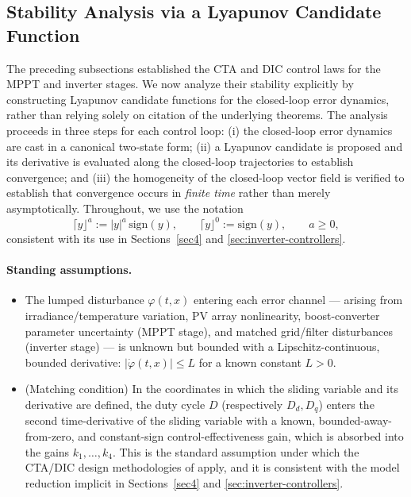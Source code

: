 \documentclass[preprint,12pt]{elsarticle}
\begin{document}
\subsection{Stability Analysis via a Lyapunov Candidate Function}
\label{subsec:stability-discussion}

The preceding subsections established the CTA and DIC control laws for the MPPT and inverter stages. We now analyze their stability explicitly by constructing Lyapunov candidate functions for the closed-loop error dynamics, rather than relying solely on citation of the underlying theorems. The analysis proceeds in three steps for each control loop: (i) the closed-loop error dynamics are cast in a canonical two-state form; (ii) a Lyapunov candidate is proposed and its derivative is evaluated along the closed-loop trajectories to establish convergence; and (iii) the homogeneity of the closed-loop vector field is verified to establish that convergence occurs in \emph{finite time} rather than merely asymptotically. Throughout, we use the notation
\begin{equation}
    \lceil y \rfloor^a := |y|^a\,\mathrm{sign}(y), \qquad \lceil y \rfloor^0 := \mathrm{sign}(y), \qquad a \geq 0,
    \label{eq:power-sign-notation}
\end{equation}
consistent with its use in Sections~\ref{sec4} and \ref{sec:inverter-controllers}.

\paragraph{Standing assumptions.}
\begin{itemize}
    \item[\textbf{(A1)}] The lumped disturbance $\varphi(t,x)$ entering each error channel --- arising from irradiance/temperature variation, PV array nonlinearity, boost-converter parameter uncertainty (MPPT stage), and matched grid/filter disturbances (inverter stage) --- is unknown but bounded with a Lipschitz-continuous, bounded derivative: $|\dot{\varphi}(t,x)| \leq L$ for a known constant $L>0$.
    \item[\textbf{(A2)}] (Matching condition) In the coordinates in which the sliding variable and its derivative are defined, the duty cycle $D$ (respectively $D_d, D_q$) enters the second time-derivative of the sliding variable with a known, bounded-away-from-zero, and constant-sign control-effectiveness gain, which is absorbed into the gains $k_1,\dots,k_4$. This is the standard assumption under which the CTA/DIC design methodologies of \cite{torres2017design,moreno2017discontinuous} apply, and it is consistent with the model reduction implicit in Sections~\ref{sec4} and \ref{sec:inverter-controllers}.
\end{itemize}
\end{document}
